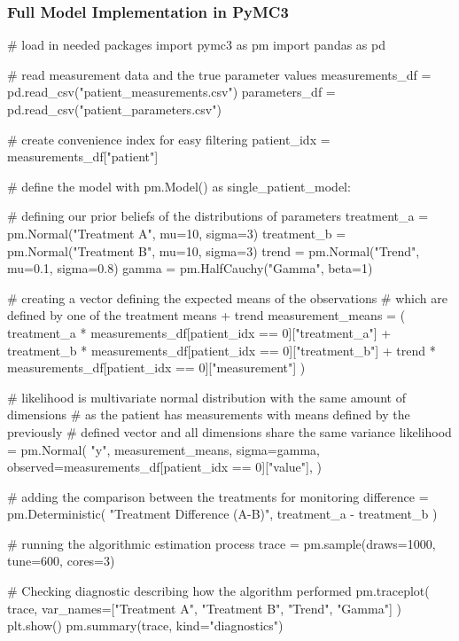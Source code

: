 \documentclass[12pt,a4paper,leqno]{report}
\theoremstyle{plain}
\theoremstyle{definition}
\theoremstyle{remark}
\begin{document}
\pagebreak

\subsubsection*{Full Model Implementation in PyMC3}
\bigskip
\begin{pyverbatim}[][fontsize=\footnotesize]
# load in needed packages
import pymc3 as pm
import pandas as pd

# read measurement data and the true parameter values
measurements_df = pd.read_csv("patient_measurements.csv")
parameters_df = pd.read_csv("patient_parameters.csv")

# create convenience index for easy filtering
patient_idx = measurements_df["patient"]
   
# define the model
with pm.Model() as single_patient_model:

    # defining our prior beliefs of the distributions of parameters
    treatment_a = pm.Normal("Treatment A", mu=10, sigma=3)
    treatment_b = pm.Normal("Treatment B", mu=10, sigma=3)
    trend = pm.Normal("Trend", mu=0.1, sigma=0.8)
    gamma = pm.HalfCauchy("Gamma", beta=1)

    # creating a vector defining the expected means of the observations
    # which are defined by one of the treatment means + trend
    measurement_means = (
        treatment_a * measurements_df[patient_idx == 0]["treatment_a"]
        + treatment_b * measurements_df[patient_idx == 0]["treatment_b"]
        + trend * measurements_df[patient_idx == 0]["measurement"]
    )

    # likelihood is multivariate normal distribution with the same amount of dimensions
    # as the patient has measurements with means defined by the previously
    # defined vector and all dimensions share the same variance
    likelihood = pm.Normal(
        "y",
        measurement_means,
        sigma=gamma,
        observed=measurements_df[patient_idx == 0]["value"],
    )

    # adding the comparison between the treatments for monitoring
    difference = pm.Deterministic(
        "Treatment Difference (A-B)", treatment_a - treatment_b
    )

    # running the algorithmic estimation process
    trace = pm.sample(draws=1000, tune=600, cores=3)

    # Checking diagnostic describing how the algorithm performed
    pm.traceplot(
        trace, var_names=["Treatment A", "Treatment B", "Trend", "Gamma"]
    )
    plt.show()
    pm.summary(trace, kind="diagnostics")


\end{pyverbatim}
\end{document}
